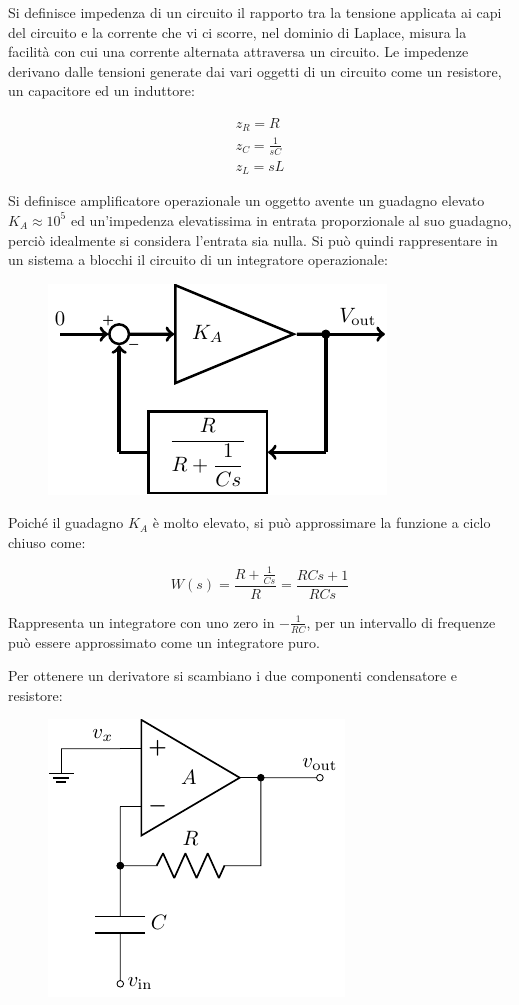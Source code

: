 \documentclass{article}
\numberwithin{equation}{subsection}
\begin{document}
Si definisce impedenza di un circuito il rapporto tra la tensione applicata ai capi del circuito e la corrente che vi ci scorre, nel dominio di Laplace, misura la facilità 
con cui una corrente alternata attraversa un circuito. Le impedenze 
derivano dalle tensioni generate dai vari oggetti di un circuito come un resistore, un capacitore ed un induttore: 

\begin{gather*}
    z_R=R\\
    z_C=\displaystyle\frac{1}{sC}\\
    z_L=sL
\end{gather*}

Si definisce amplificatore operazionale un oggetto avente un guadagno elevato $K_A\approx10^5$ ed un'impedenza elevatissima in entrata proporzionale al suo guadagno, perciò idealmente si 
considera l'entrata sia nulla. Si può quindi rappresentare in un sistema a blocchi il circuito di un integratore operazionale:

\begin{figure}[H]%
    \centering
    \includegraphics{integratore.pdf}%
\end{figure}

Poiché il guadagno $K_A$ è molto elevato, si può approssimare la funzione a ciclo chiuso come: 

\begin{equation*}
    W(s)=\displaystyle\frac{R+\displaystyle\frac{1}{Cs}}{R}=\frac{RCs+1}{RCs}
\end{equation*}

Rappresenta un integratore con uno zero in $-\displaystyle\frac{1}{RC}$, per un intervallo di frequenze può essere approssimato come un integratore puro. 

Per ottenere un derivatore si scambiano i due componenti condensatore e resistore:
\begin{figure}[H]%
    \centering
    \includegraphics{circuito-derivatore.pdf}%
\end{figure}
\end{document}
